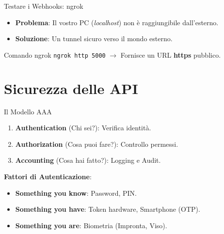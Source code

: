 \documentclass[10pt]{beamer}
\begin{document}
\begin{frame}{Testare i Webhooks: ngrok}
    \begin{itemize}
        \item \textbf{Problema}: Il vostro PC (\textit{localhost}) non è raggiungibile dall'esterno.
        \item \textbf{Soluzione}: Un tunnel sicuro verso il mondo esterno.
    \end{itemize}
    \centering
    \vspace{0.3cm}
    \begin{block}{Comando ngrok}
        \texttt{ngrok http 5000} $\rightarrow$ Fornisce un URL \textbf{https} pubblico.
    \end{block}
\end{frame}

\section{Sicurezza delle API}

\begin{frame}{Il Modello AAA}
    \begin{enumerate}
        \item \textbf{Authentication} (Chi sei?): Verifica identit\`a.
        \item \textbf{Authorization} (Cosa puoi fare?): Controllo permessi.
        \item \textbf{Accounting} (Cosa hai fatto?): Logging e Audit.
    \end{enumerate}
    \vspace{0.5cm}
    \textbf{Fattori di Autenticazione}:
    \begin{itemize}
        \item \textbf{Something you know}: Password, PIN.
        \item \textbf{Something you have}: Token hardware, Smartphone (OTP).
        \item \textbf{Something you are}: Biometria (Impronta, Viso).
    \end{itemize}
\end{frame}
\end{document}
